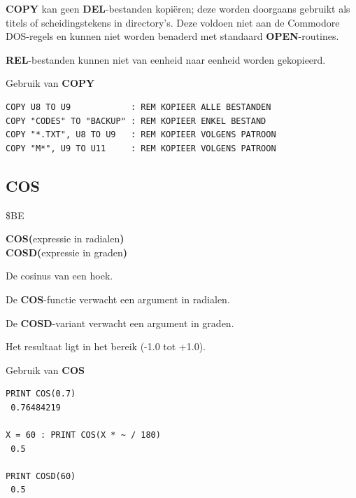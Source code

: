 \begin{description}[leftmargin=2cm,style=nextline]
                  {\bf COPY} kan geen {\bf DEL}-bestanden kopiëren; deze worden doorgaans gebruikt als titels of scheidingstekens in directory's. Deze voldoen niet aan de Commodore DOS-regels en kunnen niet worden benaderd met standaard {\bf OPEN}-routines.

                  {\bf REL}-bestanden kunnen niet van eenheid naar eenheid worden gekopieerd.

\item [Voorbeelden:] Gebruik van {\bf COPY}

\begin{tcolorbox}[colback=black,coltext=white]
\verbatimfont{\codefont}
\begin{verbatim}
COPY U8 TO U9            : REM KOPIEER ALLE BESTANDEN
COPY "CODES" TO "BACKUP" : REM KOPIEER ENKEL BESTAND
COPY "*.TXT", U8 TO U9   : REM KOPIEER VOLGENS PATROON
COPY "M*", U9 TO U11     : REM KOPIEER VOLGENS PATROON
\end{verbatim}
\end{tcolorbox}
\end{description}


\newpage
\subsection{COS}
\begin{description}[leftmargin=2cm,style=nextline]
\item [Token:]    \$BE

\item [Formaat:]   {\bf COS(}expressie in radialen{\bf )} \\                 {\bf COSD(}expressie in graden{\bf )}

\item [Retourneert:]  De cosinus van een hoek.

                  De {\bf COS}-functie verwacht een argument in radialen.

                  De {\bf COSD}-variant verwacht een argument in graden.

                  Het resultaat ligt in het bereik (-1.0 tot +1.0).

\item [Voorbeelden:] Gebruik van {\bf COS}

\begin{tcolorbox}[colback=black,coltext=white]
\verbatimfont{\codefont}
\begin{verbatim}
PRINT COS(0.7)
 0.76484219

X = 60 : PRINT COS(X * ~ / 180)
 0.5

PRINT COSD(60)
 0.5
\end{verbatim}
\end{tcolorbox}
\end{description}

